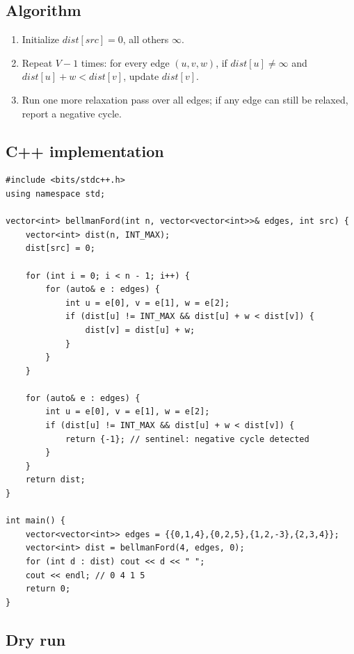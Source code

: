 \subsection*{Algorithm}

\begin{enumerate}
  \item Initialize $\textit{dist}[\textit{src}]=0$, all others
        $\infty$.
  \item Repeat $V{-}1$ times: for every edge $(u,v,w)$, if
        $\textit{dist}[u] \neq \infty$ and $\textit{dist}[u]+w <
        \textit{dist}[v]$, update $\textit{dist}[v]$.
  \item Run one more relaxation pass over all edges; if any edge can
        still be relaxed, report a negative cycle.
\end{enumerate}

\subsection*{C++ implementation}

\begin{lstlisting}
#include <bits/stdc++.h>
using namespace std;

vector<int> bellmanFord(int n, vector<vector<int>>& edges, int src) {
    vector<int> dist(n, INT_MAX);
    dist[src] = 0;

    for (int i = 0; i < n - 1; i++) {
        for (auto& e : edges) {
            int u = e[0], v = e[1], w = e[2];
            if (dist[u] != INT_MAX && dist[u] + w < dist[v]) {
                dist[v] = dist[u] + w;
            }
        }
    }

    for (auto& e : edges) {
        int u = e[0], v = e[1], w = e[2];
        if (dist[u] != INT_MAX && dist[u] + w < dist[v]) {
            return {-1}; // sentinel: negative cycle detected
        }
    }
    return dist;
}

int main() {
    vector<vector<int>> edges = {{0,1,4},{0,2,5},{1,2,-3},{2,3,4}};
    vector<int> dist = bellmanFord(4, edges, 0);
    for (int d : dist) cout << d << " ";
    cout << endl; // 0 4 1 5
    return 0;
}
\end{lstlisting}

\subsection*{Dry run}


